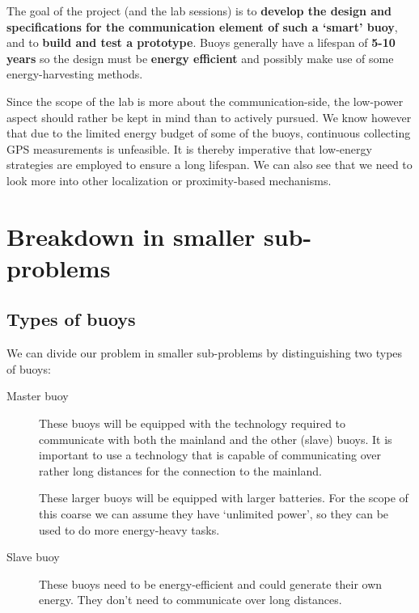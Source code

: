 \documentclass[11pt,a4paper,twoside]{article} %
\begin{document}
The goal of the project (and the lab sessions) is to \textbf{develop the design and specifications for the communication element of such a `smart' buoy}, and to \textbf{build and test a prototype}. Buoys generally have a lifespan of \textbf{5-10 years} so the design must be \textbf{energy efficient} and possibly make use of some energy-harvesting methods.

Since the scope of the lab is more about the communication-side, the low-power aspect should rather be kept in mind than to actively pursued. We know however that due to the limited energy budget of some of the buoys, continuous collecting GPS measurements is unfeasible. It is thereby imperative that low-energy strategies are employed to ensure a long lifespan. We can also see that we need to look more into other localization or proximity-based mechanisms.

\clearpage


\section{Breakdown in smaller sub-problems}

\subsection{Types of buoys}

We can divide our problem in smaller sub-problems by distinguishing two types of buoys:

\begin{description}
    \item [Master buoy] These buoys will be equipped with the technology required to communicate with both the mainland and the other (slave) buoys. It is important to use a technology that is capable of communicating over rather long distances for the connection to the mainland. 
    
    These larger buoys will be equipped with larger batteries. For the scope of this coarse we can assume they have `unlimited power', so they can be used to do more energy-heavy tasks.
    
    \item [Slave buoy] These buoys need to be energy-efficient and could generate their own energy. They don't need to communicate over long distances.
\end{description}
\end{document}
